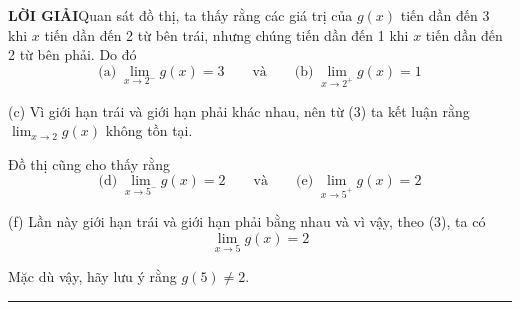 \vspace{6pt}
\noindent\textbf{\textsf{\color{stewartcyan}LỜI GIẢI}}\quad Quan sát đồ thị, ta thấy rằng các giá trị của $g(x)$ tiến dần đến 3 khi $x$ tiến dần đến 2 từ bên trái, nhưng chúng tiến dần đến 1 khi $x$ tiến dần đến 2 từ bên phải. Do đó
\begin{equation*}
\text{(a)}\; \lim_{x \to 2^-} g(x) = 3 \qquad\text{và}\qquad \text{(b)}\; \lim_{x \to 2^+} g(x) = 1
\end{equation*}

(c) Vì giới hạn trái và giới hạn phải khác nhau, nên từ (3) ta kết luận rằng $\displaystyle\lim_{x \to 2} g(x)$ không tồn tại.

\vspace{2pt}
Đồ thị cũng cho thấy rằng
\begin{equation*}
\text{(d)}\; \lim_{x \to 5^-} g(x) = 2 \qquad\text{và}\qquad \text{(e)}\; \lim_{x \to 5^+} g(x) = 2
\end{equation*}

(f) Lần này giới hạn trái và giới hạn phải bằng nhau và vì vậy, theo (3), ta có
\[
\lim_{x \to 5} g(x) = 2
\]

Mặc dù vậy, hãy lưu ý rằng $g(5) \ne 2$.\hfill{\color{stewartcyan}\rule{1.1ex}{1.1ex}}
